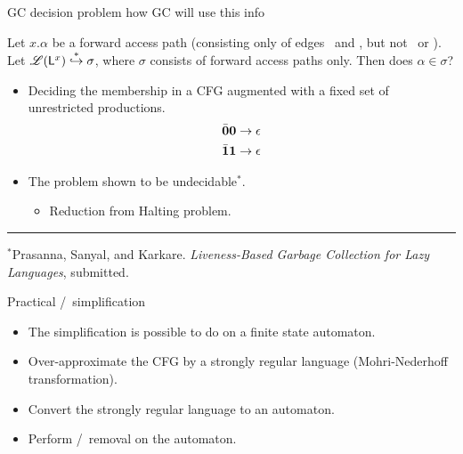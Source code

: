 \documentclass[xcolor=x11names,compress,mathserif]{beamer}
\renewcommand{\(}{\begin{columns}}
\renewcommand{\)}{\end{columns}}
\newcommand{\<}[1]{\begin{column}{#1}}
\renewcommand{\>}{\end{column}}
\begin{document}
\begin{frame}{GC decision problem}
  {\red how GC will use this info}


Let $x.\alpha$ be  a forward  access path  (consisting only  of edges
\acar\    and    \acdr,    but    not   \bcar\    or    \bcdr).     Let
$\mathscr{L}(\mathsf{L}_{{}}^{x})  \stackrel{*}\hookrightarrow  \sigma$,  where
$\sigma$ consists of forward access  paths only. Then does $\alpha \in
\sigma$?
\bigskip \pause
\begin{itemize}
\item Deciding the
  membership in  a CFG augmented  with a
  fixed set of unrestricted productions.
  \begin{align*}
    \bar{\mathbf{0}}\mathbf{0}    \rightarrow    \epsilon\\
    \bar{\mathbf{1}}\mathbf{1}    \rightarrow   \epsilon\\
  \end{align*}
\item The problem shown to be undecidable$^*$.
  \begin{itemize}
  \item Reduction from Halting problem.
  \end{itemize}
\end{itemize}
\hrule
\vfill
$^*${\scriptsize Prasanna, Sanyal, and Karkare. {\em Liveness-Based Garbage Collection for Lazy Languages}, submitted.}
\end{frame}
\begin{frame}{Practical \bcar/\bcdr\  simplification}

\begin{itemize}
\item The simplification is possible to do on a finite state automaton.
\item Over-approximate the CFG by a strongly regular language
  (Mohri-Nederhoff transformation).
\item Convert the strongly regular language to an
  automaton. 
\item Perform \acar/\acdr\ removal on the automaton.
\end{itemize}

\end{frame}
\end{document}
